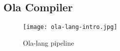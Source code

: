 \subsection{Ola Compiler}


\begin{figure}[!ht]
    \centering
    \texttt{[image: ola-lang-intro.jpg]}
    \caption{Ola-lang pipeline}
    \label{fig:ola-lang-intro}
\end{figure}




